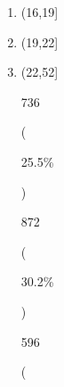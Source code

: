 \documentclass[
]{book}
\providecommand{\tightlist}{%
  \setlength{\itemsep}{0pt}\setlength{\parskip}{0pt}}
\begin{document}
\begin{enumerate}
  1358

  (

  55.8\%

  )

  2435
  (83.7\%)

  475
  (16.3\%)

  22

  edad1sex2
  {[}numeric{]}

  Mean (sd) : 1.7 (4.7)
  min \textless{} med \textless{} max:
  -13 \textless{} 1 \textless{} 34
  IQR (CV) : 6 (2.7)

  40 distinct values

  2889
  (99.3\%)

  21
  (0.7\%)

  23

  edad1sex3
  {[}numeric{]}

  Min : 0
  Mean : 0.5
  Max : 1

  0

  :

  1379

  (

  47.7\%

  )

  1

  :

  1510

  (

  52.3\%

  )

  2889
  (99.3\%)

  21
  (0.7\%)

  24

  edad1sex4
  {[}factor{]}

  \begin{enumerate}
  \def\labelenumii{\arabic{enumii}.}
  \tightlist
  \item
    (5,16{]}
  \end{enumerate}
\item
  (16,19{]}
\item
  (19,22{]}
\item
  (22,52{]}

  736

  (

  25.5\%

  )

  872

  (

  30.2\%

  )

  596

  (


\end{enumerate}
\end{document}
